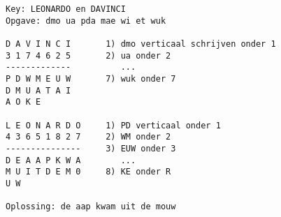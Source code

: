 \begin{lstlisting}
Key: LEONARDO en DAVINCI
Opgave: dmo ua pda mae wi et wuk

D A V I N C I		1) dmo verticaal schrijven onder 1
3 1 7 4 6 2 5		2) ua onder 2
-------------		   ...
P D W M E U W		7) wuk onder 7
D M U A T A I
A O K E

L E O N A R D O		1) PD verticaal onder 1
4 3 6 5 1 8 2 7		2) WM onder 2
---------------		3) EUW onder 3
D E A A P K W A		   ...
M U I T D E M 0		8) KE onder R
U W     

Oplossing: de aap kwam uit de mouw
\end{lstlisting}